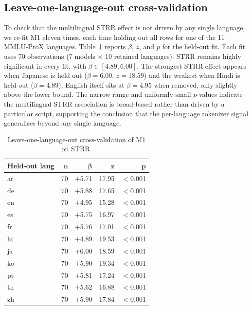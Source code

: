 \documentclass[11pt]{article}
\begin{document}
\subsection*{Leave-one-language-out cross-validation}
\label{app:lme_lolo}

To check that the multilingual STRR effect is not driven by any single language, we re-fit M1 eleven times, each time holding out all rows for one of the 11 MMLU-ProX languages. Table~\ref{tab:lme_lolo} reports $\beta$, $z$, and $p$ for the held-out fit. Each fit uses 70 observations (7 models $\times$ 10 retained languages). STRR remains highly significant in every fit, with $\beta \in [4.89, 6.00]$. The strongest STRR effect appears when Japanese is held out ($\beta = 6.00$, $z = 18.59$) and the weakest when Hindi is held out ($\beta = 4.89$); English itself sits at $\beta = 4.95$ when removed, only slightly above the lower bound. The narrow range and uniformly small $p$-values indicate the multilingual STRR association is broad-based rather than driven by a particular script, supporting the conclusion that the per-language tokenizer signal generalises beyond any single language.

\begin{table}[H]
\centering
\small
\begin{tabular}{lrrrr}
\toprule
\textbf{Held-out lang} & $\boldsymbol{n}$ & $\boldsymbol{\beta}$ & $\boldsymbol{z}$ & $\boldsymbol{p}$ \\
\midrule
ar & 70 & $+$5.71 & 17.95 & $<$0.001 \\
de & 70 & $+$5.88 & 17.65 & $<$0.001 \\
en & 70 & $+$4.95 & 15.28 & $<$0.001 \\
es & 70 & $+$5.75 & 16.97 & $<$0.001 \\
fr & 70 & $+$5.76 & 17.01 & $<$0.001 \\
hi & 70 & $+$4.89 & 19.53 & $<$0.001 \\
ja & 70 & $+$6.00 & 18.59 & $<$0.001 \\
ko & 70 & $+$5.90 & 19.34 & $<$0.001 \\
pt & 70 & $+$5.81 & 17.24 & $<$0.001 \\
th & 70 & $+$5.62 & 16.88 & $<$0.001 \\
zh & 70 & $+$5.90 & 17.84 & $<$0.001 \\
\bottomrule
\end{tabular}
\caption{Leave-one-language-out cross-validation of M1 on STRR.}
\label{tab:lme_lolo}
\end{table}
\end{document}
